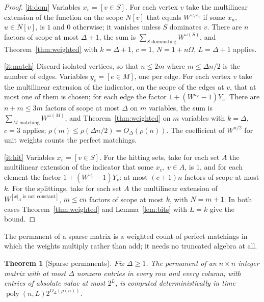 \documentclass[11pt,reqno]{amsart}
\numberwithin{equation}{section}
\theoremstyle{plain}
\newtheorem{theorem}{Theorem}[section]
\theoremstyle{definition}
\theoremstyle{remark}
\DeclareMathOperator{\poly}{poly}
\newcommand{\rhon}{\rho}
\begin{document}
\begin{proof}
\ref{it:dom} Variables $x_v=[v\in S]$. For each vertex $v$ take the multilinear
extension of the function on the scope $N[v]$ that equals $W^{\omega_vx_v}$ if
some $x_u$, $u\in N[v]$, is $1$ and $0$ otherwise; it vanishes unless $S$
dominates $v$. There are $n$ factors of scope at most $\Delta+1$, the sum is
$\sum_{S\text{ dominating}}W^{\omega(S)}$, and Theorem~\ref{thm:weighted} with
$k=\Delta+1$, $c=1$, $N=1+n\Omega$, $L=\Delta+1$ applies.

\ref{it:match} Discard isolated vertices, so that $n\le2m$ where $m\le\Delta n/2$
is the number of edges. Variables $y_e=[e\in M]$, one per edge. For each vertex
$v$ take the multilinear extension of the indicator, on the scope of the edges at
$v$, that at most one of them is chosen; for each edge the factor
$1+(W^{\omega_e}-1)Y_e$. There are $n+m\le3m$ factors of scope at most
$\Delta$ on $m$ variables, the sum is $\sum_{M\text{ matching}}W^{\omega(M)}$,
and Theorem~\ref{thm:weighted} on $m$ variables with $k=\Delta$, $c=3$ applies;
$\rhon(m)\le\rhon(\Delta n/2)=O_\Delta(\rhon(n))$. The coefficient of $W^{n/2}$
for unit weights counts the perfect matchings.

\ref{it:hit} Variables $x_v=[v\in S]$. For the hitting sets, take for each set
$A$ the multilinear extension of the indicator that some $x_v$, $v\in A$, is
$1$, and for each element the factor $1+(W^{\omega_v}-1)Y_v$: at most
$(c+1)n$ factors of scope at most $k$. For the splittings, take for each set
$A$ the multilinear extension of $W^{[\text{$x|_A$ is not constant}]}$, $m\le cn$
factors of scope at most $k$, with $N=m+1$. In both cases
Theorem~\ref{thm:weighted} and Lemma~\ref{lem:bits} with $L=k$ give the bound.
\end{proof}

The permanent of a sparse matrix is a weighted count of perfect matchings in
which the weights multiply rather than add; it needs no truncated algebra at
all.

\begin{theorem}[Sparse permanents]\label{thm:permanent}
Fix $\Delta\ge1$. The permanent of an $n\times n$ integer matrix with at most
$\Delta$ nonzero entries in every row and every column, with entries of absolute
value at most $2^{L}$, is computed deterministically in time
$\poly(n,L)2^{O_\Delta(\rhon(n))}$.
\end{theorem}
\end{document}
